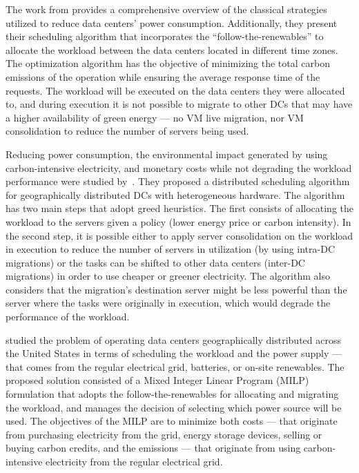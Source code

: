 The work from \citet{XU2020191} provides a comprehensive overview of the classical strategies utilized to reduce data centers' power consumption. Additionally, they present their scheduling algorithm that incorporates the ``follow-the-renewables'' to allocate the workload between the data centers located in different time zones. The optimization algorithm has the objective of minimizing the total carbon emissions of the operation while ensuring the average response time of the requests. The workload will be executed on the data centers they were allocated to, and during execution it is not possible to migrate to other DCs that may have a higher availability of green energy --- no VM live migration, nor VM consolidation to reduce the number of servers being used.


Reducing power consumption, the environmental impact generated by using carbon-intensive electricity, and monetary costs while not degrading the workload performance were studied by~\citet{ALI2021110907}. They proposed a distributed scheduling algorithm for geographically distributed DCs with heterogeneous hardware. The algorithm has two main steps that adopt greed heuristics. The first consists of allocating the workload to the servers given a policy (lower energy price or carbon intensity). In the second step, it is possible either to apply server consolidation on the workload in execution to reduce the number of servers in utilization (by using intra-DC migrations) or the tasks can be shifted to other data centers (inter-DC migrations) in order to use cheaper or greener electricity. The algorithm also considers that the migration's destination server might be less powerful than the server where the tasks were originally in execution, which would degrade the performance of the workload.


\citet{RUIZDUARTE2023_operation_dcs_renewables} studied the problem of operating data centers geographically distributed across the United States in terms of scheduling the workload and the power supply --- that comes from the regular electrical grid, batteries, or on-site renewables. The proposed solution consisted of a Mixed Integer Linear Program (MILP) formulation that adopts the follow-the-renewables for allocating and migrating the workload, and manages the decision of selecting which power source will be used. The objectives of the MILP are to minimize both costs --- that originate from purchasing electricity from the grid, energy storage devices, selling or buying carbon credits, and the  emissions  --- that originate from using carbon-intensive electricity from the regular electrical grid.



